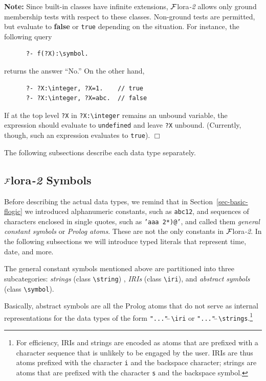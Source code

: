 \documentclass[11pt]{article}
\newcommand{\FLORA}{{\mbox{\sc ${\cal F}${lora}\rm\emph{-2}}}\xspace}
\newcommand{\FLSYSTEM}{\FLORA}
\newcommand{\bs}{\textbackslash}
\begin{document}
\noindent
{\bf Note:} Since built-in classes have infinite extensions, \FLSYSTEM
allows only
ground membership tests with respect to these classes. Non-ground tests are
permitted, but evaluate to {\bf false} or \texttt{true} depending on the
situation. For instance, the following
query
\begin{verbatim}
      ?- f(?X):\symbol.
\end{verbatim}
returns the answer ``No.''
On the other hand,
\begin{verbatim}
      ?- ?X:\integer, ?X=1.    // true
      ?- ?X:\integer, ?X=abc.  // false
\end{verbatim}
If at the top level \texttt{?X} in \texttt{?X:\bs{}integer} remains an
unbound variable, the expression should evaluate to \texttt{undefined} and
leave \texttt{?X} unbound. (Currently, though, such an expression evaluates
to \texttt{true}).     
\hfill$\Box$

The following subsections
describe each data type separately.

\subsection{\FLSYSTEM Symbols}

\index{datatype!\bs{}symbol}
Before describing the actual data types, we remind that
in Section~\ref{sec-basic-flogic} we introduced
alphanumeric constants, such as {\tt abc12}, and sequences of characters
enclosed in single quotes, such as {\tt 'aaa 2*)@'},  and called them
\emph{general constant symbols} or \emph{Prolog atoms}. These are not the
only constants in \FLSYSTEM.
In the following subsections we will introduce typed literals that
represent time, date, and more.

\index{class!\bs{}symbol}
The general constant symbols mentioned above are partitioned into three subcategories:
\emph{strings} (class \texttt{\bs{}string}) , \emph{IRIs} (class
\texttt{\bs{}iri}), and \emph{abstract symbols} (class \texttt{\bs{}symbol}). 

Basically, abstract symbols are all the Prolog atoms that do not
serve as internal representations for the data types
of the form \texttt{"..."$\hat{~}\hat{~}$\bs{}iri} or
\texttt{"..."$\hat{~}\hat{~}$\bs{}strings}.\footnote{
  For efficiency, IRIs and strings are encoded as atoms that are prefixed
  with a character sequence that is unlikely to be engaged by the user.
  IRIs are thus atoms prefixed
  with the character \texttt{i} and the backspace character; strings are atoms
  that are prefixed with the character
  \texttt{s} and the backspace symbol.
  }
\end{document}
